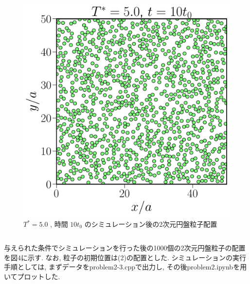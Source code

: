 \documentclass[a4paper,dvipdfmx]{jarticle}
\begin{document}
\begin{figure}[H]
    \centering
    \includegraphics[scale=0.6]{problem_2/2-2/problem2-2.pdf}
    \caption{$T^*=5.0$ , 時間 $10t_0$ のシミュレーション後の2次元円盤粒子配置}
\end{figure}

\subsection{}
\noindent
与えられた条件でシミュレーションを行った後の1000個の2次元円盤粒子の配置を図4に示す.
なお, 粒子の初期位置は(2)の配置とした.
シミュレーションの実行手順としては, まずデータをproblem2-3.cppで出力し, 
その後problem2.ipynbを用いてプロットした.
\end{document}
